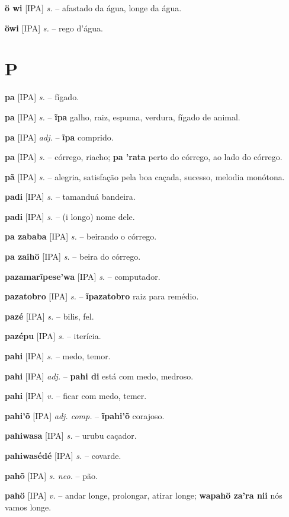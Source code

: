 \textbf{ö wi} [IPA] \textit{s.} -- afastado da água, longe da água.

\textbf{öwi} [IPA] \textit{s.} -- rego d'água.


\section*{P}



\textbf{pa} [IPA] \textit{s.} -- fígado.

\textbf{pa} [IPA] \textit{s.} -- \textbf{ĩpa} galho, raiz, espuma, verdura, fígado de animal.

\textbf{pa} [IPA] \textit{adj.} -- \textbf{ĩpa} comprido.

\textbf{pa} [IPA] \textit{s.} -- córrego, riacho; \textbf{pa 'rata} perto do córrego, ao lado do córrego.

\textbf{pã} [IPA] \textit{s.} -- alegria, satisfação pela boa caçada, sucesso, melodia monótona.

\textbf{padi} [IPA] \textit{s.} -- tamanduá bandeira.

\textbf{padi} [IPA] \textit{s.} -- (i longo) nome dele.

\textbf{pa zababa} [IPA] \textit{s.} -- beirando o córrego.

\textbf{pa zaihö} [IPA] \textit{s.} -- beira do córrego.

\textbf{pazamarĩpese'wa} [IPA] \textit{s.} -- computador.

\textbf{pazatobro} [IPA] \textit{s.} -- \textbf{ĩpazatobro} raiz para remédio.

\textbf{pazé} [IPA] \textit{s.} -- bilis, fel.

\textbf{pazépu} [IPA] \textit{s.} -- iterícia.

\textbf{pahi} [IPA] \textit{s.} -- medo, temor.

\textbf{pahi} [IPA] \textit{adj.} -- \textbf{pahi di} está com medo, medroso.

\textbf{pahi} [IPA] \textit{v.} -- ficar com medo, temer.

\textbf{pahi'õ} [IPA] \textit{adj. comp.} -- \textbf{ĩpahi'õ} corajoso.

\textbf{pahiwasa} [IPA] \textit{s.} -- urubu caçador.

\textbf{pahiwasédé} [IPA] \textit{s.} -- covarde.

\textbf{pahõ} [IPA] \textit{s. neo.} -- pão.

\textbf{pahö} [IPA] \textit{v.} -- andar longe, prolongar, atirar longe; \textbf{wapahö za'ra nii} nós vamos longe.

